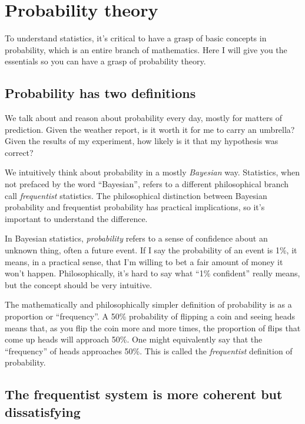 
\chapter{Probability theory}
\label{chapter:probability}

To understand statistics, it's critical to have a grasp of basic concepts in
probability, which is an entire branch of mathematics. Here I will give you
the essentials so you can have a grasp of probability theory.

\section{Probability has two definitions}

We talk about and reason about probability every day, mostly for matters of
prediction. Given the weather report, is it worth it for me to carry an
umbrella? Given the results of my experiment, how likely is it that my
hypothesis was correct?

We intuitively think about probability in a mostly \emph{Bayesian} way.
Statistics, when not prefaced by the word ``Bayesian'', refers to a different
philosophical branch call \emph{frequentist} statistics. The philosophical
distinction between Bayesian probability and frequentist probability has
practical implications, so it's important to understand the difference.

In Bayesian statistics, \emph{probability} refers to a sense of confidence
about an unknown thing, often a future event. If I say the probability of an
event is 1\%, it means, in a practical sense, that I'm willing to bet a fair
amount of money it won't happen. Philosophically, it's hard to say what ``1\%
confident'' really means, but the concept should be very intuitive.

The mathematically and philosophically simpler definition of probability is as
a proportion or ``frequency''. A 50\% probability of flipping a coin and seeing
heads means that, as you flip the coin more and more times, the proportion of
flips that come up heads will approach 50\%. One might equivalently say that
the ``frequency'' of heads approaches 50\%. This is called the
\emph{frequentist} definition of probability.


\section{The frequentist system is more coherent but dissatisfying}

